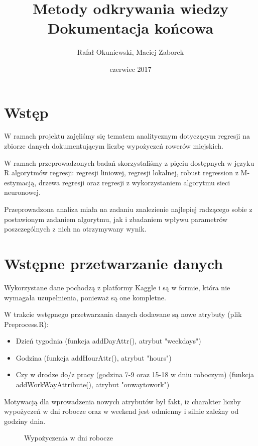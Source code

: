 \documentclass[a4paper,12pt]{article}
\title{Metody odkrywania wiedzy\\\Large{Dokumentacja końcowa}}
\author{Rafał Okuniewski, Maciej Zaborek}
\date{czerwiec 2017}
\begin{document}
 
\maketitle
 
\section{Wstęp}
W ramach projektu zajęliśmy się tematem analitycznym dotyczącym regresji na zbiorze danych dokumentującym liczbę wypożyczeń rowerów miejskich.
 
W ramach przeprowadzonych badań skorzystaliśmy z pięciu dostępnych w języku R algorytmów regresji: regresji liniowej, regresji lokalnej, robust regression z M-estymacją, drzewa regresji oraz regresji z wykorzystaniem algorytmu sieci neuronowej.
 
Przeprowadzona analiza miała na zadaniu znalezienie najlepiej radzącego sobie z postawionym zadaniem algorytmu, jak i zbadaniem wpływu parametrów poszczególnych z nich na otrzymywany wynik.
\section{Wstępne przetwarzanie danych}
Wykorzystane dane pochodzą z platformy Kaggle i są w formie, która nie wymagała uzupełnienia, ponieważ są one kompletne.
 
W trakcie wstępnego przetwarzania danych dodawane są nowe atrybuty (plik Preprocess.R):
    \begin{itemize}
        \item
            Dzień tygodnia (funkcja addDayAttr(), atrybut "weekdays")
        \item
            Godzina (funkcja addHourAttr(), atrybut "hours")
        \item
            Czy w drodze do/z pracy (godzina 7-9 oraz 15-18 w dniu roboczym) (funkcja addWorkWayAttribute(), atrybut "onwaytowork")
    \end{itemize}

Motywacją dla wprowadzenia nowych atrybutów był fakt, iż charakter liczby wypożyczeń w dni robocze oraz w weekend jest odmienny i silnie zależny od godziny dnia.

\begin{figure}[!htb]
    \center
    \caption{Wypożyczenia w dni robocze}
\end{figure}
\end{document}
